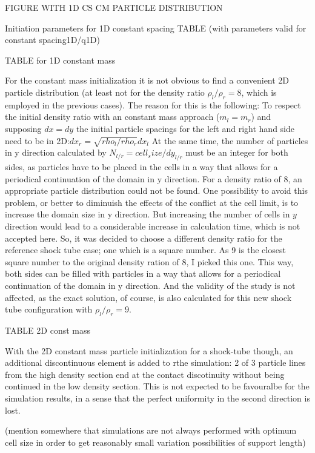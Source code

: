 \documentclass{report}
\begin{document}
FIGURE WITH 1D CS CM PARTICLE DISTRIBUTION

Initiation parameters for 1D constant spacing TABLE
(with parameters valid for constant spacing1D/q1D)


TABLE for 1D constant mass


For the constant mass initialization it is not obvious to find a convenient 2D particle distribution (at least not for the density ratio $\rho_l/\rho_r=8$, which is employed in the previous cases). The reason for this is the following:
To respect the initial density ratio with an constant mass approach ($m_l=m_r$) and supposing $dx=dy$ the initial particle spacings for the left and right hand side need to be in 2D:$dx_r=\sqrt{rho_l/rho_r} dx_l$
At the same time, the number of particles in y direction calculated by $N_{l/r}=cell_size/dy_{l/r}$ must 
be an integer for both sides, as particles have to be placed in the cells in a way that allows for a periodical continuation of the domain in y direction.
For a density ratio of 8, an appropriate particle distribution could not be found. One possibility to avoid this problem, or better to diminuish the effects of the conflict at the cell limit, is to increase the domain size in y direction. But increasing the number of cells in $y$ direction would lead to a considerable increase in calculation time, which is not accepted here. So, it was decided to choose a different density ratio for the reference shock tube case; one which is a square number. As 9 is the closest square number to the original density ration of 8, I picked this one.
This way, both sides can be filled with particles in a way that allows for a periodical continuation of the domain in y direction. And the validity of the study is not affected, as the exact solution, of course, is also calculated for this new shock tube configuration with $\rho_l/\rho_r=9$. 

TABLE 2D const mass

With the 2D constant mass particle initialization for a shock-tube though, an additional discontinuous element is added to rthe simulation: 2 of 3 particle lines from the high density section end at the contact discotinuity without being continued in the low density section. This is not expected to be favouralbe for the simulation results, in a sense that the perfect uniformity in the second direction is lost.


(mention somewhere that simulations are not always performed with optimum cell size in order to get reasonably small variation possibilities of support length)
\linebreak                                                                                                                                   
 \linebreak                                                                                                                                   
                                                                                                                                              
\end{document}
